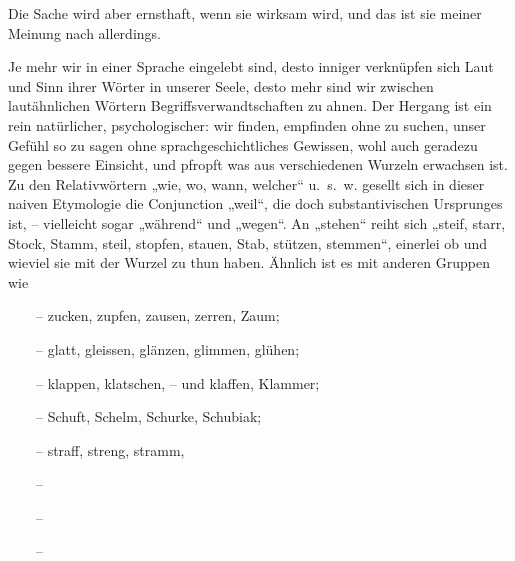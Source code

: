 {Die Sache wird aber ernsthaft, wenn sie wirksam wird, und das ist sie meiner Meinung nach allerdings.

\label{sp.220}

Je mehr wir in einer Sprache eingelebt sind, desto inniger verknüpfen sich Laut und Sinn ihrer Wörter in unserer Seele, desto mehr sind wir  zwischen lautähnlichen Wörtern Begriffsverwandtschaften zu ahnen. Der Hergang ist ein rein natürlicher, psychologischer: wir finden, empfinden ohne zu suchen, unser Gefühl  so zu sagen ohne sprachgeschichtliches Gewissen, wohl auch geradezu gegen  bessere Einsicht, und pfropft  was aus verschiedenen Wurzeln erwachsen ist. Zu den Relativwörtern „wie, wo, wann, welcher“ u.~s.~w. gesellt sich in dieser naiven Etymologie die Conjunction „weil“, die doch substantivischen Ursprunges ist, – vielleicht sogar „während“ und \label{fp.219} „wegen“. An „stehen“ reiht sich „steif, starr, Stock, Stamm, steil, stopfen, stauen, Stab, stützen, stemmen“, einerlei ob und wieviel sie mit der Wurzel  zu  thun haben. Ähnlich ist es mit anderen Gruppen wie

~~~~– zucken, zupfen, zausen, zerren, Zaum;

~~~~– glatt, gleissen, glänzen, glimmen, glühen;

~~~~– klappen, klatschen, – und klaffen, Klammer;

~~~~– Schuft, Schelm, Schurke, Schubiak;

~~~~– straff, streng, stramm, 

~~~~– 

~~~~– 

~~~~– 

}
